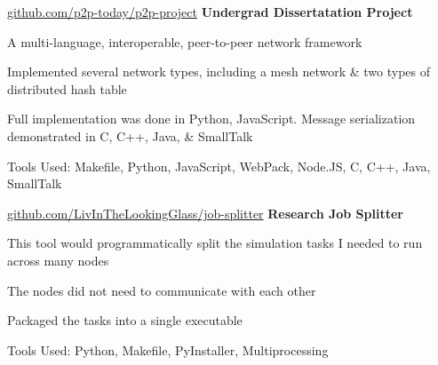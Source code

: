	\begin{samepage}
		\begin{twocolentry}
			{\hspace{-3 cm} \href{https://github.com/p2p-today/p2p-project}{ \mbox{github.com/p2p-today/p2p-project}} } \textbf{Undergrad Dissertatation Project}
		\end{twocolentry}
	
		\begin{onecolentry}
			\begin{highlights}
				\item A multi-language, interoperable, peer-to-peer network framework
				\item Implemented several network types, including a mesh network \& two types of distributed hash table
				\item Full implementation was done in Python, JavaScript. Message serialization demonstrated in C, C+\!+, Java, \& SmallTalk
				\item Tools Used: Makefile, Python, JavaScript, WebPack, Node.JS, C, C+\!+, Java, SmallTalk
			\end{highlights}
		\end{onecolentry}
	\end{samepage}

	\vspace{0.2 cm}

	\begin{samepage}
		\begin{twocolentry}
			{\hspace{-3 cm} \href{https://github.com/LivInTheLookingGlass/job-splitter}{ \mbox{github.com/LivInTheLookingGlass/job-splitter}} } \textbf{Research Job Splitter}
		\end{twocolentry}
	
		\begin{onecolentry}
			\begin{highlights}
				\item This tool would programmatically split the simulation tasks I needed to run across many nodes
				\item The nodes did not need to communicate with each other
				\item Packaged the tasks into a single executable
				\item Tools Used: Python, Makefile, PyInstaller, Multiprocessing
			\end{highlights}
		\end{onecolentry}
	\end{samepage}

